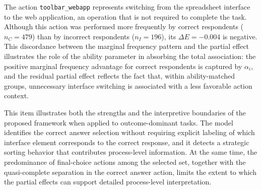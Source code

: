 \documentclass[A4paper,11pt]{article}
\begin{document}
The action \texttt{toolbar\_webapp} represents switching from the spreadsheet interface to the web application, an operation that is not required to complete the task. Although this action was performed more frequently by correct respondents ($n_C = 479$) than by incorrect respondents ($n_I = 196$), its $\Delta E = -0.004$ is negative. This discordance between the marginal frequency pattern and the partial effect illustrates the role of the ability parameter in absorbing the total association: the positive marginal frequency advantage for correct respondents is captured by $\alpha_i$, and the residual partial effect reflects the fact that, within ability-matched groups, unnecessary interface switching is associated with a less favorable action context.

This item illustrates both the strengths and the interpretive boundaries of the proposed framework when applied to outcome-dominant tasks. The model identifies the correct answer selection without requiring explicit labeling of which interface element corresponds to the correct response, and it detects a strategic sorting behavior that contributes process-level information. At the same time, the predominance of final-choice actions among the selected set, together with the quasi-complete separation in the correct answer action, limits the extent to which the partial effects can support detailed process-level interpretation.

\end{document}
